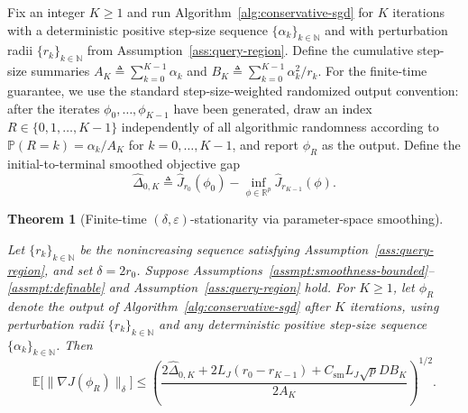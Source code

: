 \documentclass[11pt, letterpaper, oneside, reqno]{amsart}
\newcommand{\R}{\mathbb{R}}
\newcommand{\Let}{\triangleq}
\newtheorem{theorem}{Theorem}
\begin{document}
Fix an integer $K\ge 1$ and run Algorithm~\ref{alg:conservative-sgd} for $K$ iterations with a deterministic positive step-size sequence $\{\alpha_k\}_{k\in\mathbb N}$ and with perturbation radii $\{r_k\}_{k\in\mathbb N}$ from Assumption~\ref{ass:query-region}.
Define the cumulative step-size summaries
$A_K\Let\sum_{k=0}^{K-1}\alpha_k$ and
$B_K\Let\sum_{k=0}^{K-1}\alpha_k^2/r_k$.
For the finite-time guarantee, we use the standard step-size-weighted randomized output convention:
after the iterates $\phi_0,\ldots,\phi_{K-1}$ have been generated, draw an index
$R\in\{0,1,\dots,K-1\}$ independently of all algorithmic randomness according to
$\mathbb P(R=k)=\alpha_k/A_K$ for $k=0,\ldots,K-1$, and report $\phi_R$ as the output.
Define the initial-to-terminal smoothed objective gap
\[
\hat\Delta_{0,K}
\Let \hat J_{r_0}(\phi_0)-\inf_{\phi\in\R^p}\hat J_{r_{K-1}}(\phi).
\]


\begin{theorem}[Finite-time $(\delta,\varepsilon)$-stationarity via parameter-space smoothing]
\label{thm:finite-time}

Let $\{r_k\}_{k\in\mathbb N}$ be the nonincreasing sequence satisfying Assumption~\ref{ass:query-region}, and set $\delta=2r_0$. Suppose Assumptions~\ref{assmpt:smoothness-bounded}--\ref{assmpt:definable} and Assumption~\ref{ass:query-region} hold.
For $K \ge 1$, let $\phi_R$ denote the output of Algorithm~\ref{alg:conservative-sgd} after $K$ iterations, using perturbation radii $\{r_k\}_{k\in\mathbb N}$ and any deterministic positive step-size sequence $\{\alpha_k\}_{k\in\mathbb N}$.
Then
\[
\mathbb{E}\big[\|\nabla J(\phi_R)\|_{\delta}\big]
\le \left(
\frac{2\hat\Delta_{0,K} + 2L_J(r_0-r_{K-1}) + C_{\mathrm{sm}}L_J\sqrt p D B_K}{2A_K}
\right)^{1/2}.
\]
\end{theorem}
\end{document}
